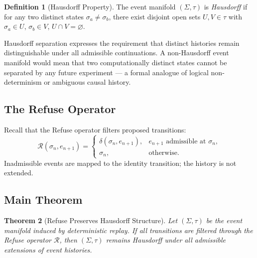 \documentclass[12pt, twoside]{article}
\theoremstyle{plain}
\newtheorem{theorem}{Theorem}[section]
\theoremstyle{definition}
\newtheorem{definition}[theorem]{Definition}
\theoremstyle{remark}
\begin{document}
\begin{definition}[Hausdorff Property]
The event manifold $(\Sigma, \tau)$ is \emph{Hausdorff} if for any
two distinct states $\sigma_a \neq \sigma_b$, there exist
disjoint open sets $U, V \in \tau$ with
$\sigma_a \in U$, $\sigma_b \in V$, $U \cap V = \varnothing$.
\end{definition}

Hausdorff separation expresses the requirement that distinct histories
remain distinguishable under all admissible continuations.
A non-Hausdorff event manifold would mean that two computationally
distinct states cannot be separated by any future experiment —
a formal analogue of logical non-determinism or ambiguous causal history.

\subsection{The Refuse Operator}

Recall that the Refuse operator filters proposed transitions:
\[
  \mathcal{R}(\sigma_n, e_{n+1})
  = \begin{cases}
      \delta(\sigma_n, e_{n+1}), & e_{n+1} \text{ admissible at } \sigma_n, \\
      \sigma_n,                  & \text{otherwise.}
    \end{cases}
\]
Inadmissible events are mapped to the identity transition;
the history is not extended.

\subsection{Main Theorem}

\begin{theorem}[Refuse Preserves Hausdorff Structure]
\label{thm:hausdorff}
Let $(\Sigma, \tau)$ be the event manifold induced by deterministic
replay.
If all transitions are filtered through the Refuse operator
$\mathcal{R}$, then $(\Sigma, \tau)$ remains Hausdorff under all
admissible extensions of event histories.
\end{theorem}
\end{document}
